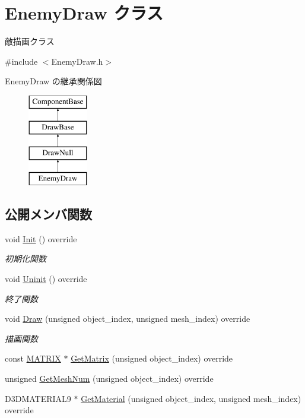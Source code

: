 \hypertarget{class_enemy_draw}{}\section{Enemy\+Draw クラス}
\label{class_enemy_draw}


敵描画クラス  




{\ttfamily \#include $<$Enemy\+Draw.\+h$>$}

Enemy\+Draw の継承関係図\begin{figure}[H]
\begin{center}
\leavevmode
\includegraphics[height=4.000000cm]{class_enemy_draw}
\end{center}
\end{figure}
\subsection*{公開メンバ関数}
\begin{DoxyCompactItemize}
\item 
void \mbox{\hyperlink{class_enemy_draw_aa1659c35fa757db6a6cf07e26ad9ddfb}{Init}} () override
\begin{DoxyCompactList}\small\item\em 初期化関数 \end{DoxyCompactList}\item 
void \mbox{\hyperlink{class_enemy_draw_a2861dc0623b0be7726bc69a6a469190e}{Uninit}} () override
\begin{DoxyCompactList}\small\item\em 終了関数 \end{DoxyCompactList}\item 
void \mbox{\hyperlink{class_enemy_draw_a20a23c1c5fd5e510d15e8ca27aabd821}{Draw}} (unsigned object\+\_\+index, unsigned mesh\+\_\+index) override
\begin{DoxyCompactList}\small\item\em 描画関数 \end{DoxyCompactList}\item 
const \mbox{\hyperlink{_vector3_d_8h_a032295cd9fb1b711757c90667278e744}{M\+A\+T\+R\+IX}} $\ast$ \mbox{\hyperlink{class_enemy_draw_a6f2a052a45caf0d255112cbe81b8bfa3}{Get\+Matrix}} (unsigned object\+\_\+index) override
\item 
unsigned \mbox{\hyperlink{class_enemy_draw_acda1a2487aea432b08fc816351a12239}{Get\+Mesh\+Num}} (unsigned object\+\_\+index) override
\item 
D3\+D\+M\+A\+T\+E\+R\+I\+A\+L9 $\ast$ \mbox{\hyperlink{class_enemy_draw_a12f00116f7fa97e07317a949d5c27bb4}{Get\+Material}} (unsigned object\+\_\+index, unsigned mesh\+\_\+index) override
\end{DoxyCompactItemize}


